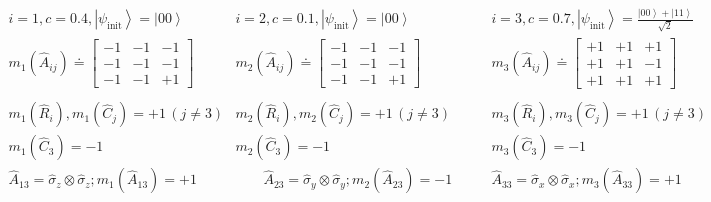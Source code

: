 \documentclass[british,aps,prl,superscriptaddress,nofootinbib,times,reprint]{revtex4-1}
\theoremstyle{plain}
\theoremstyle{definition}
\theoremstyle{remark}
\theoremstyle{remark}
\theoremstyle{remark}
\theoremstyle{plain}
\theoremstyle{plain}
\theoremstyle{plain}
\theoremstyle{definition}
\theoremstyle{definition}
\begin{document}
\begin{table}
 \begin{equation*}
\begin{array}{ccc} 
i=1,c=0.4,\left|\psi_{\text{init}}\right\rangle=\left|00\right\rangle & i=2,c=0.1,\left|\psi_{\text{init}}\right\rangle=\left|00\right\rangle & i=3,c=0.7,\left|\psi_{\text{init}}\right\rangle=\frac{\left|00\right\rangle +\left|11\right\rangle}{\sqrt{2}} \\

m_{1}(\hat{A}_{ij})\doteq\left[\begin{array}{ccc} -1 & -1 & -1\\ -1 & -1 & -1\\ -1 & -1 & +1\end{array}\right] &
m_{2}(\hat{A}_{ij})\doteq\left[\begin{array}{ccc}-1 & -1 & -1\\ -1 & -1 & -1\\ -1 & -1 & +1\end{array}\right] &
m_{3}(\hat{A}_{ij})\doteq\left[\begin{array}{ccc}+1 & +1 & +1\\ +1 & +1 & -1\\ +1 & +1 & +1\end{array}\right]\\ \\


m_{1}(\hat{R}_{i}),m_{1}(\hat{C}_{j})=+1\,(j\neq3) &
m_{2}(\hat{R}_{i}),m_{2}(\hat{C}_{j})=+1\,(j\neq3) &
m_{3}(\hat{R}_{i}),m_{3}(\hat{C}_{j})=+1\,(j\neq3)\\

m_{1}(\hat{C}_{3})=-1 & m_{2}(\hat{C}_{3})=-1 & m_{3}(\hat{C}_{3})=-1\\ 


\hat{A}_{13}=\hat{\sigma}_{z}\otimes\hat{\sigma}_{z};m_{1}(\hat{A}_{13})=+1&
\quad\quad\hat{A}_{23}=\hat{\sigma}_{y}\otimes\hat{\sigma}_{y};m_{2}(\hat{A}_{23})=-1\quad\quad&
\hat{A}_{33}=\hat{\sigma}_{x}\otimes\hat{\sigma}_{x};m_{3}(\hat{A}_{33})=+1\\


\end{array}
\end{equation*}
\end{table}
\end{document}
